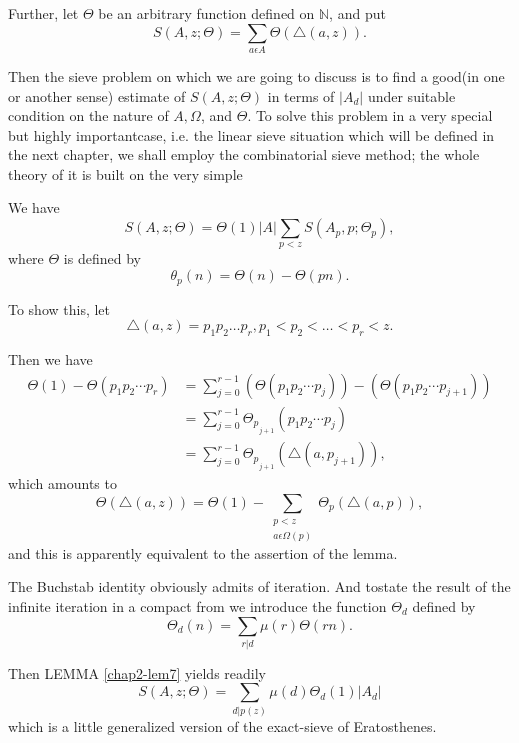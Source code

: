 Further, let $\Theta$ be an arbitrary function defined on
$\mathbb{N}$, and put 
$$
S (A,z;\Theta) = \sum_{a \epsilon  A} \Theta (\triangle (a,z)).
$$

Then the sieve problem on which we are going to discuss is to find a
good(in one or another sense) estimate of $ S(A,z; \Theta)$ in
terms of $|A_d|$ under suitable condition on the nature of $A,\Omega$,
and $\Theta$. To solve this problem in a very special but highly
important\pageoriginale case, i.e. the linear sieve situation which will be defined
in the next chapter, we shall employ the combinatorial sieve method;
the whole theory of it is built on the very simple    

\begin{Lemma}\label{chap2-lem7}%
We have 
  \begin{equation*}
    S(A, z; \Theta) = \Theta (1)|A| \sum_{p < z} S(A_p,p;
   \Theta_p), \tag{2.1.1} \label{eq2.1.1}
  \end{equation*}
  where $\Theta $ is defined by 
  $$
  \theta_p (n) = \Theta(n) - \Theta(pn). 
  $$
\end{Lemma} 

To show this, let 
$$
\triangle(a,z) = p_1p_2 \dots p_r,p_1 <p_2 <\dots< p_r <z.
$$

Then we have
\begin{align*}
  \Theta (1) - \Theta  (p_1p_2 \cdots p_r) & = \sum_{j=0}^{r-1}
  (\Theta (p_1p_2 \cdots p_j)) - (\Theta (p_1p_2 \cdots p_{j+1}))\\ 
  &=\sum_{j=0}^{r-1}  \Theta{_p}_{_{j+1}} (p_1p_2 \cdots p_j)\\
  &=\sum_{j=0}^{r-1}  \Theta{_p}_{_{j+1}} (\triangle(a,p_{j+1})),
\end{align*}
which amounts to 
$$
\Theta (\triangle(a,z)) = \Theta (1) - \sum_{\substack{p < z\\ a
    \epsilon  \Omega(p)}} \Theta_p (\triangle(a,p)), 
$$
and this is apparently equivalent to the assertion of the lemma.

The Buchstab identity obviously admits of iteration. And
to\pageoriginale state the 
result of the infinite iteration in a compact from we introduce the
function $\Theta_d$ defined by 
$$
\Theta_d(n) = \sum_{r|d} \mu (r) \Theta  (r n).
$$

Then LEMMA \ref{chap2-lem7} yields readily
\begin{equation*}
  S(A,z;\Theta ) = \sum_{d|p (z)} \mu(d) \Theta_d(1) |A_d|
  \tag{2.1.2}\label{eq2.1.2} 
\end{equation*}
which is a little generalized version of the exact-sieve of Eratosthenes.

